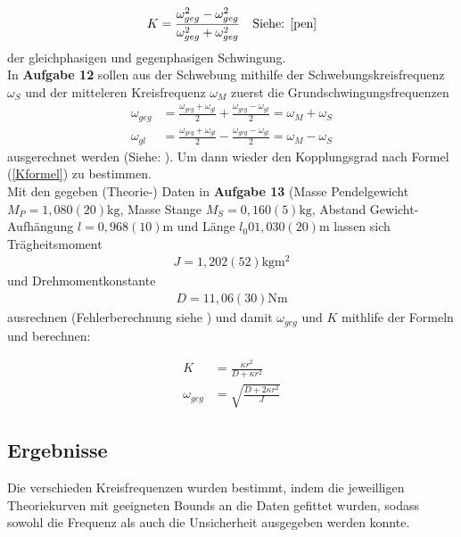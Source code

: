 \documentclass[11pt, a4paper]{article}
\begin{document}
    \begin{align} \label{Kformel}
        K = \frac{\omega_{geg}^2 - \omega_{geg}^2}{\omega_{geg}^2 + \omega_{geg}^2} \ \ \ \text{Siehe: \cite[Formel (35)]{pen}}
    \end{align}
    der gleichphasigen und gegenphasigen Schwingung. \\

    In \textbf{Aufgabe 12} sollen aus der Schwebung mithilfe der Schwebungskreisfrequenz $\omega_S$
    und der mitteleren Kreisfrequenz  $\omega_M$ zuerst die Grundschwingungsfrequenzen
    \begin{align}
        \omega_{geg} &= \frac{\omega_{geg} + \omega_{gl}}{2} + \frac{\omega_{geg} - \omega_{gl}}{2} = \omega_M + \omega_S \\
        \omega_{gl} &= \frac{\omega_{geg} + \omega_{gl}}{2} - \frac{\omega_{geg} - \omega_{gl}}{2} = \omega_M - \omega_S
    \end{align}
    ausgerechnet werden (Siehe: \cite[Formel (34)]{pen}). Um dann wieder den Kopplungsgrad nach Formel (\ref{Kformel})
    zu bestimmen. \\
    Mit den gegeben (Theorie-) Daten in \textbf{Aufgabe 13} \cite{pen} (Masse Pendelgewicht $M_P = 1,080(20)\si{\kilogram}$,
    Masse Stange $M_S = 0,160(5)\si{\kilogram}$, Abstand Gewicht-Aufhängung $l = 0,968(10)\si{\metre}$ und Länge $l_0 0 1,030(20)\si{\metre}$
    lassen sich Trägheitsmoment
    \begin{align}
        J = 1,202(52)\si{\kilogram\metre\squared} \label{J}
    \end{align}
    und Drehmomentkonstante
    \begin{align}
        D = 11,06(30)\si{\newton\metre} \label{D}
    \end{align} 
    ausrechnen (Fehlerberechnung siehe \cite[Formel (19)]{ABW}) und damit $\omega_{geg}$ und $K$
    mithlife der Formeln \cite[(30)]{pen} und \cite[(35)]{pen}
    berechnen:
    
    \begin{align}
        K &= \frac{\kappa r^2}{D + \kappa r^2} \\
        \omega_{geg} &= \sqrt{\frac{D+2\kappa r^2}{J}}
    \end{align}


    \subsection{Ergebnisse}

    Die verschieden Kreisfrequenzen wurden bestimmt, indem die jeweilligen Theoriekurven mit geeigneten
    Bounds an die Daten gefittet wurden, sodass sowohl die Frequenz als auch die Unsicherheit ausgegeben
    werden konnte.
\end{document}

